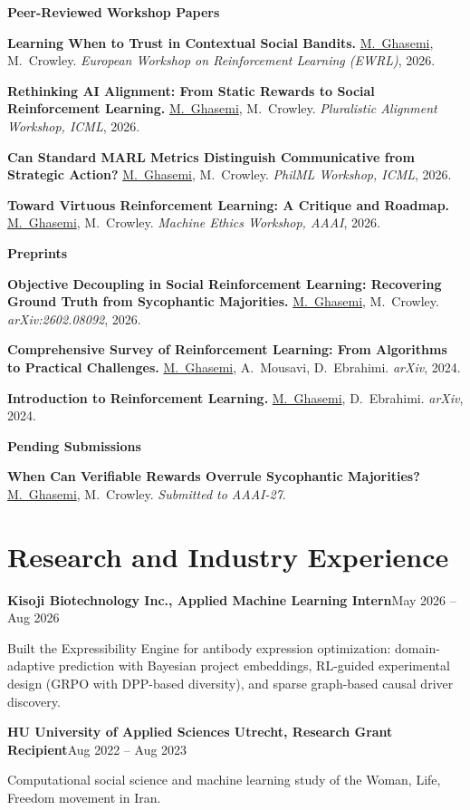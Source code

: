 \documentclass[letterpaper,11pt]{article}
\newcommand{\role}[2]{\textbf{#1}\hfill{#2}\par}
\newcommand{\gap}{\par\vspace{0.35em}}
\newcommand{\me}{\underline{M.~Ghasemi}}
\newcommand{\pubhead}[1]{\vspace{0.25em}\textbf{\small #1}\par}
\begin{document}
\pubhead{Peer-Reviewed Workshop Papers}
\begin{pubs}[label={[W\arabic*]}]
  \item \textbf{Learning When to Trust in Contextual Social Bandits.} \me, M.~Crowley. \textit{European Workshop on Reinforcement Learning (EWRL)}, 2026.
  \item \textbf{Rethinking AI Alignment: From Static Rewards to Social Reinforcement Learning.} \me, M.~Crowley. \textit{Pluralistic Alignment Workshop, ICML}, 2026.
  \item \textbf{Can Standard MARL Metrics Distinguish Communicative from Strategic Action?} \me, M.~Crowley. \textit{PhilML Workshop, ICML}, 2026.
  \item \textbf{Toward Virtuous Reinforcement Learning: A Critique and Roadmap.} \me, M.~Crowley. \textit{Machine Ethics Workshop, AAAI}, 2026.
\end{pubs}
\pubhead{Preprints}
\begin{pubs}[label={[P\arabic*]}]
  \item \textbf{Objective Decoupling in Social Reinforcement Learning: Recovering Ground Truth from Sycophantic Majorities.} \me, M.~Crowley. \textit{arXiv:2602.08092}, 2026.
  \item \textbf{Comprehensive Survey of Reinforcement Learning: From Algorithms to Practical Challenges.} \me, A.~Mousavi, D.~Ebrahimi. \textit{arXiv}, 2024.
  \item \textbf{Introduction to Reinforcement Learning.} \me, D.~Ebrahimi. \textit{arXiv}, 2024.
\end{pubs}
\pubhead{Pending Submissions}
\begin{pubs}[label={[S\arabic*]}]
  \item \textbf{When Can Verifiable Rewards Overrule Sycophantic Majorities?} \me, M.~Crowley. \textit{Submitted to AAAI-27}.
\end{pubs}

\section{Research and Industry Experience}
\role{Kisoji Biotechnology Inc., Applied Machine Learning Intern}{May 2026 -- Aug 2026}
Built the Expressibility Engine for antibody expression optimization: domain-adaptive prediction with Bayesian project embeddings, RL-guided experimental design (GRPO with DPP-based diversity), and sparse graph-based causal driver discovery.
\gap
\role{HU University of Applied Sciences Utrecht, Research Grant Recipient}{Aug 2022 -- Aug 2023}
Computational social science and machine learning study of the Woman, Life, Freedom movement in Iran.
\end{document}
